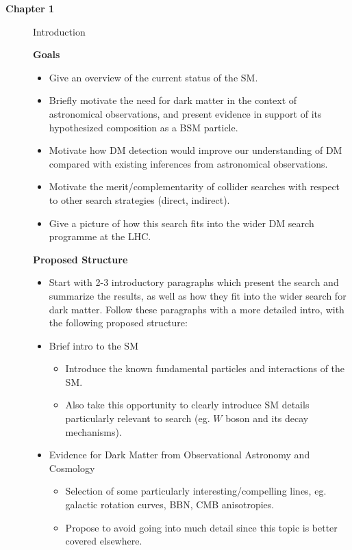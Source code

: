 \label{chapter:introduction}

\begin{description}
\item[\textbf{Chapter 1}] Introduction 

\textbf{Goals}
\begin{itemize}
\item Give an overview of the current status of the SM.
\item Briefly motivate the need for dark matter in the context of astronomical observations, and present evidence in support of its hypothesized composition as a BSM particle.
\item Motivate how DM detection would improve our understanding of DM compared with existing inferences from astronomical observations.
\item Motivate the merit/complementarity of collider searches with respect to other search strategies (direct, indirect).
\item Give a picture of how this search fits into the wider DM search programme at the LHC.
\end{itemize}

\textbf{Proposed Structure}
\begin{itemize}

\item Start with 2-3 introductory paragraphs which present the search and summarize the results, as well as how they fit into the wider search for dark matter. Follow these paragraphs with a more detailed intro, with the following proposed structure:

\item Brief intro to the SM
\begin{itemize}
\item Introduce the known fundamental particles and interactions of the SM.
\item Also take this opportunity to clearly introduce SM details particularly relevant to search (eg. $W$ boson and its decay mechanisms).
\end{itemize}

\item Evidence for Dark Matter from Observational Astronomy and Cosmology
\begin{itemize}
\item Selection of some particularly interesting/compelling lines, eg. galactic rotation curves, BBN, CMB anisotropies.
\item Propose to avoid going into much detail since this topic is better covered elsewhere. 
\end{itemize}


\end{itemize}
\end{description}
